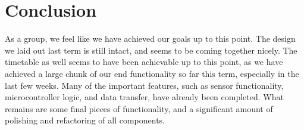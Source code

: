 \documentclass[IEEEtran,letterpaper,10pt,titlepage,fleqn,draftclsnofoot,onecolumn]{article}
\begin{document}
\section{Conclusion}

As a group, we feel like we have achieved our goals up to this point. The design we laid out last term is still intact, and seems to be coming together nicely. The timetable as well seems to have been achievable up to this point, as we have achieved a large chunk of our end functionality so far this term, especially in the last few weeks. Many of the important features, such as sensor functionality, microcontroller logic, and data transfer, have already been completed. What remains are some final pieces of functionality, and a significant amount of polishing and refactoring of all components. 
\end{document}
